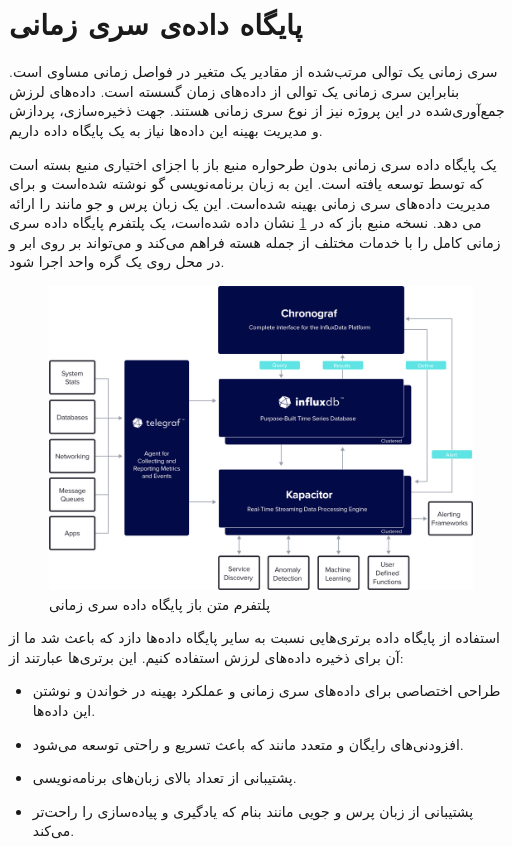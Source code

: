 \section{پایگاه داده‌ی سری زمانی}

سری زمانی یک توالی مرتب‌شده از مقادیر یک متغیر در فواصل زمانی مساوی است. بنابراین سری زمانی یک توالی از داده‌های زمان گسسته است\cite{naqvi2017time}. داده‌های لرزش جمع‌آوری‌شده در این پروژه نیز از نوع سری زمانی هستند. جهت ذخیره‌سازی، پردازش و مدیریت بهینه این داده‌ها نیاز به یک پایگاه داده داریم.


 یک پایگاه داده سری زمانی بدون طرحواره منبع باز با اجزای اختیاری منبع بسته است که توسط  توسعه یافته است. این به زبان برنامه‌نویسی گو نوشته شده‌است و برای مدیریت داده‌های سری زمانی بهینه شده‌است. این یک زبان پرس و جو مانند  را ارائه می دهد. نسخه منبع باز که در \cref{fig:influx} \cite{influx} نشان داده شده‌است، یک پلتفرم پایگاه داده سری زمانی کامل را با خدمات مختلف از جمله هسته  فراهم می‌کند و می‌تواند بر روی ابر و در محل روی یک گره واحد اجرا شود.

\begin{figure}[!h]
\centering\includegraphics[scale=.11]{influx.png}
\caption{پلتفرم متن باز پایگاه داده سری زمانی  \cite{influx}}\label{fig:influx}
\end{figure}

استفاده از پایگاه داده  برتری‌هایی نسبت به سایر پایگاه داده‌ها دازد که باعث شد ما از آن برای ذخیره داده‌های لرزش استفاده کنیم. این برتری‌ها عبارتند از:

\begin{itemize}
\item طراحی اختصاصی برای داده‌های سری زمانی و عملکرد بهینه در خواندن و نوشتن این داده‌ها.
\item افزودنی‌های رایگان و متعدد مانند  که باعث تسریع و راحتی توسعه می‌شود.
\item پشتیبانی از تعداد بالای زبان‌های برنامه‌نویسی.
\item پشتیبانی از زبان پرس و جویی مانند  بنام  که یادگیری و پیاده‌سازی را راحت‌تر می‌کند.
\end{itemize}


